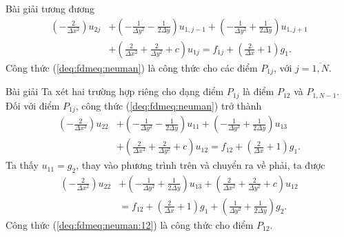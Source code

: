 \documentclass[9pt]{beamer}
\numberwithin{equation}{section}
\begin{document}
\begin{frame}
\begin{exampleblock}{Bài giải}
    tương đương
    \begin{align}
        \left(-\frac{2}{\Delta x^2}\right) u_{2j} &+
        \left(-\frac{1}{\Delta y^2} - \frac{1}{2 \Delta y}\right) u_{1,j-1} +
        \left(-\frac{1}{\Delta y^2} + \frac{1}{2 \Delta y}\right) u_{1,j+1} \nonumber \\&+
        \left(\frac{2}{\Delta x^2} + \frac{2}{\Delta y^2} + c\right) u_{1j} =
        f_{1j} + \left(\frac{2}{\Delta x} + 1\right) g_1. \label{deq:fdmeq:neuman}
    \end{align}
    Công thức (\ref{deq:fdmeq:neuman}) là công thức cho các điểm $P_{1j}$, với $j = \overline{1,N}$.
\end{exampleblock}
\end{frame}

\begin{frame}
\begin{exampleblock}{Bài giải}
    Ta xét hai trường hợp riêng cho dạng điểm $P_{1j}$ là điểm $P_{12}$ và $P_{1,N-1}$. Đối với điểm $P_{1j}$, công thức (\ref{deq:fdmeq:neuman}) trở thành
    \begin{align*}
        \left(-\frac{2}{\Delta x^2}\right) u_{22} &+
        \left(-\frac{1}{\Delta y^2} - \frac{1}{2 \Delta y}\right) u_{11} +
        \left(-\frac{1}{\Delta y^2} + \frac{1}{2 \Delta y}\right) u_{13} \nonumber \\&+
        \left(\frac{2}{\Delta x^2} + \frac{2}{\Delta y^2} + c\right) u_{12} =
        f_{12} + \left(\frac{2}{\Delta x} + 1\right) g_1. 
    \end{align*}
    Ta thấy $u_{11} = g_2$, thay vào phương trình trên và chuyển ra về phải, ta được
    \begin{align}
        \left(-\frac{2}{\Delta x^2}\right) u_{22} &+
        \left(-\frac{1}{\Delta y^2} + \frac{1}{2 \Delta y}\right) u_{13} +
        \left(\frac{2}{\Delta x^2} + \frac{2}{\Delta y^2} + c\right) u_{12} \nonumber \\&=
        f_{12} + \left(\frac{2}{\Delta x} + 1\right) g_1 +
        \left(\frac{1}{\Delta y^2} + \frac{1}{2 \Delta y}\right) g_2. \label{deq:fdmeq:neuman:12}
    \end{align}
    Công thức (\ref{deq:fdmeq:neuman:12}) là công thức cho điểm $P_{12}$.
\end{exampleblock}
\end{frame}
\end{document}
